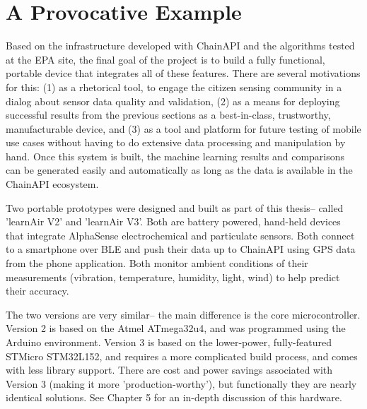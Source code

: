 \section{A Provocative Example}

Based on the infrastructure developed with ChainAPI and the algorithms tested at the EPA site, the final goal of the project is to build a fully functional, portable device that integrates all of these features.  There are several motivations for this: (1) as a rhetorical tool, to engage the citizen sensing community in a dialog about sensor data quality and validation, (2) as a means for deploying successful results from the previous sections as a best-in-class, trustworthy, manufacturable device, and (3) as a tool and platform for future testing of mobile use cases without having to do extensive data processing and manipulation by hand.  Once this system is built, the machine learning results and comparisons can be generated easily and automatically as long as the data is available in the ChainAPI ecosystem.

Two portable prototypes were designed and built as part of this thesis-- called 'learnAir V2' and 'learnAir V3'.  Both are battery powered, hand-held devices that integrate AlphaSense electrochemical and particulate sensors.  Both connect to a smartphone over BLE and push their data up to ChainAPI using GPS data from the phone application.  Both monitor ambient conditions of their measurements (vibration, temperature, humidity, light, wind) to help predict their accuracy.  

The two versions are very similar-- the main difference is the core microcontroller.  Version 2 is based on the Atmel ATmega32u4, and was programmed using the Arduino environment.  Version 3 is based on the lower-power, fully-featured STMicro STM32L152, and requires a more complicated build process, and comes with less library support.  There are cost and power savings associated with Version 3 (making it more 'production-worthy'), but functionally they are nearly identical solutions.  See Chapter 5 for an in-depth discussion of this hardware.



















%


